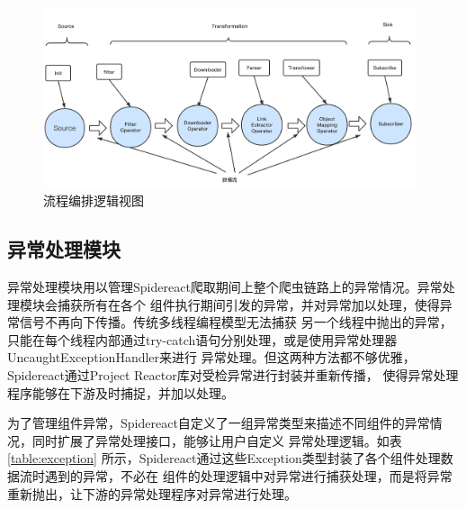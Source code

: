 \documentclass[master]{njuthesis}
\begin{document}
\begin{figure}
\centering
\includegraphics[width=0.98\textwidth]{pic/manage.png}
\caption{流程编排逻辑视图}\label{fig:manage}
\end{figure}





\subsection{异常处理模块}
异常处理模块用以管理Spidereact爬取期间上整个爬虫链路上的异常情况。异常处理模块会捕获所有在各个
组件执行期间引发的异常，并对异常加以处理，使得异常信号不再向下传播。传统多线程编程模型无法捕获
另一个线程中抛出的异常，只能在每个线程内部通过try-catch语句分别处理，或是使用异常处理器UncaughtExceptionHandler来进行
异常处理。但这两种方法都不够优雅，Spidereact通过Project Reactor库对受检异常进行封装并重新传播，
使得异常处理程序能够在下游及时捕捉，并加以处理。

为了管理组件异常，Spidereact自定义了一组异常类型来描述不同组件的异常情况，同时扩展了异常处理接口，能够让用户自定义
异常处理逻辑。如表\ref{table:exception} 所示，Spidereact通过这些Exception类型封装了各个组件处理数据流时遇到的异常，不必在
组件的处理逻辑中对异常进行捕获处理，而是将异常重新抛出，让下游的异常处理程序对异常进行处理。
\end{document}
